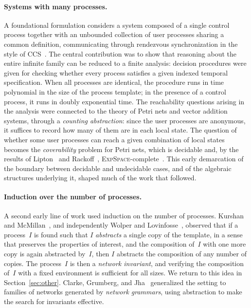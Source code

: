 \paragraph{Systems with many processes.}
A foundational formulation considers a system composed of a single control
process together with an unbounded collection of user processes sharing a
common definition, communicating through rendezvous synchronization in the
style of CCS~\cite{GerSis92}. The central contribution was to show that
reasoning about the entire infinite family can be reduced to a finite analysis:
decision procedures were given for checking whether every process satisfies a
given indexed temporal specification. When all processes are identical, the
procedure runs in time polynomial in the size of the process template; in the
presence of a control process, it runs in doubly exponential time. The
reachability questions arising in the analysis were connected to the theory of
Petri nets and vector addition systems, through a \emph{counting abstraction}:
since the user processes are anonymous, it
suffices to record how many of them are in each local state. The question of
whether some user processes can reach a given combination of local states
 becomes the
\emph{coverability} problem for Petri nets, which is decidable and, by the
results of Lipton~\cite{Lip76} and Rackoff~\cite{Rac78},
\textsc{ExpSpace}-complete~\cite{Esp98}.
This early demarcation of the boundary between decidable and undecidable cases,
and of the algebraic structures underlying it, shaped much of the work that
followed.

\paragraph{Induction over the number of processes.}
A second early line of work used induction on the number of processes. Kurshan
and McMillan~\cite{KM89}, and independently Wolper and
Lovinfosse~\cite{WL89}, observed that if a process~$I$ is found such that $I$
\emph{abstracts} a single copy of the template, in a sense that preserves the
properties of interest, and the composition of~$I$ with one more copy is again
abstracted by~$I$, then $I$ abstracts the composition of any number of copies.
The
process~$I$ is then a \emph{network invariant}, and verifying the composition
of~$I$ with a fixed environment is sufficient for all sizes. We return to this
idea in Section~\ref{sec:other}. Clarke, Grumberg, and
Jha~\cite{CGJ97} generalized the setting to families of networks generated by
\emph{network grammars}, using abstraction to make the search for invariants
effective.

